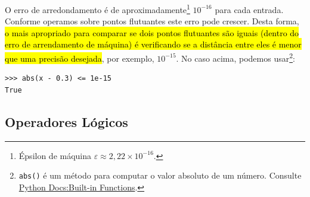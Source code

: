 O erro de arredondamento é de aproximadamente\footnote{Épsilon de máquina $\varepsilon \approx 2,22\times 10^{-16}$.} $10^{-16}$ para cada entrada. Conforme operamos sobre pontos flutuantes este erro pode crescer. Desta forma, \hl{o mais apropriado para comparar se dois pontos flutuantes são iguais (dentro do erro de arrendamento de máquina) é verificando se a distância entre eles é menor que uma precisão desejada}, por exemplo, $10^{-15}$. No caso acima, podemos usar\footnote{\lstinline+abs()+ é um método {\python} para computar o valor absoluto de um número. Consulte \href{https://docs.python.org/3/library/functions.html\#abs}{Python Docs:Built-in Functions}.}:
\begin{lstlisting}
>>> abs(x - 0.3) <= 1e-15
True
\end{lstlisting}

\subsection{Operadores Lógicos}

